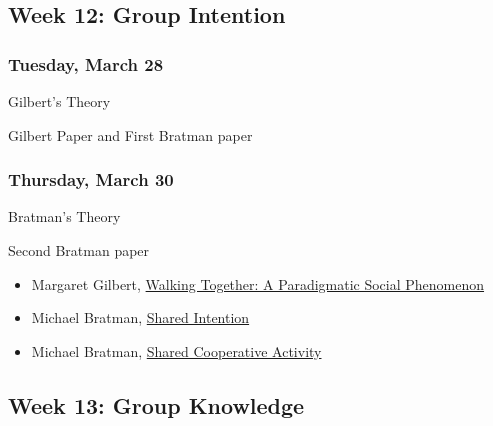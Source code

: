 \documentclass[
]{article}
\providecommand{\tightlist}{%
  \setlength{\itemsep}{0pt}\setlength{\parskip}{0pt}}
\begin{document}
\newpage

\hypertarget{week-12-group-intention}{%
\subsection{Week 12: Group Intention}\label{week-12-group-intention}}

\begin{multicols}{2}

\hypertarget{tuesday-march-28}{%
\subsubsection{Tuesday, March 28}\label{tuesday-march-28}}

\begin{description}
\tightlist
\item[Topic]
Gilbert's Theory
\item[Reading]
Gilbert Paper and First Bratman paper
\end{description}

\hypertarget{thursday-march-30}{%
\subsubsection{Thursday, March 30}\label{thursday-march-30}}

\begin{description}
\tightlist
\item[Topic]
Bratman's Theory
\item[Reading]
Second Bratman paper
\end{description}

\end{multicols}

\begin{itemize}
\tightlist
\item
  Margaret Gilbert, \href{https://philpapers.org/rec/GILWTA}{Walking
  Together: A Paradigmatic Social Phenomenon}
\item
  Michael Bratman, \href{https://philpapers.org/rec/BRASI}{Shared
  Intention}
\item
  Michael Bratman, \href{https://philpapers.org/rec/BRASCA}{Shared
  Cooperative Activity}
\end{itemize}

\hypertarget{week-13-group-knowledge}{%
\subsection{Week 13: Group Knowledge}\label{week-13-group-knowledge}}
\end{document}
